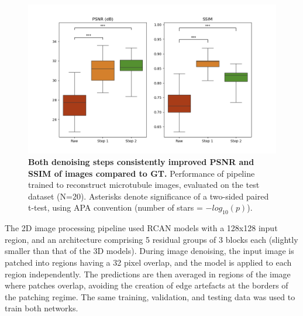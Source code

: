 \documentclass[12pt]{article}
\begin{document}
\begin{figure}[hbt]
    \includegraphics[scale=0.7, center]{figures/boxplot_mt_only.png}
    \caption{\textbf{Both denoising steps consistently improved PSNR and SSIM of images compared to GT.}
    Performance of pipeline trained to reconstruct microtubule images, evaluated on the test dataset (N=20).
    Asterisks denote significance of a two-sided paired t-test, using APA convention (number of stars = $-log_{10}(p)$).}
    \label{fig:m019_m020_pipeline_stats}
\end{figure}

The 2D image processing pipeline used RCAN models with a 128x128 input region,
and an architecture comprising 5 residual groups of 3 blocks each (slightly smaller than that of the 3D models).
During image denoising, the input image is patched into regions having a 32 pixel overlap,
and the model is applied to each region independently.
The predictions are then averaged in regions of the image where patches overlap,
avoiding the creation of edge artefacts at the borders of the patching regime.
The same training, validation, and testing data was used to train both networks.
\end{document}
